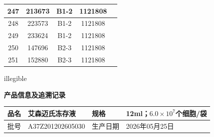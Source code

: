 \documentclass[UTF8,10pt,a4paper,fontset=fandol]{ctexart}
\newcommand{\fieldvalue}[1]{#1}
\newcommand{\handwritten}[1]{#1}
\begin{document}
\begin{center}
\begin{tabular}{|c|c|c|c|c|}
247 &
\fieldvalue{213673} &
\fieldvalue{B1-2} &
\fieldvalue{1121808} & \\ \hline
248 &
\fieldvalue{223573} &
\fieldvalue{B1-2} &
\fieldvalue{1121808} & \\ \hline
249 &
\fieldvalue{233624} &
\fieldvalue{B1-2} &
\fieldvalue{1121808} & \\ \hline
250 &
\fieldvalue{147696} &
\fieldvalue{B2-3} &
\fieldvalue{1121808} & \\ \hline
251 &
\fieldvalue{152880} &
\fieldvalue{B2-3} &
\fieldvalue{1121808} & \\ \hline
\end{tabular}
\end{center}

\handwritten{ illegible }

\newpage

\begin{center}
\textbf{产品信息及追溯记录}
\end{center}

\begin{tabular}{|l|l|l|l|}
\hline
品名 &
\fieldvalue{艾森迈氏冻存液} &
规格 &
\fieldvalue{12ml；$6.0\times 10^{7}$个细胞/袋} \\
\hline
批号 &
\fieldvalue{A37Z201202605030} &
生产日期 &
\fieldvalue{2026年05月25日} \\
\hline
\end{tabular}
\end{document}
